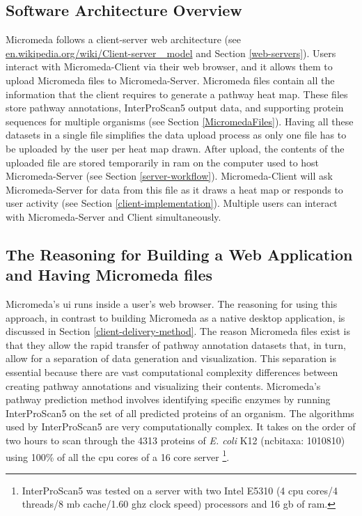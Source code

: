 \subsection{Software Architecture Overview}

Micromeda follows a client-server web architecture \cite{svobodova1985client} (see \href{http://en.wikipedia.org/wiki/Client-server_model}{en.wikipedia.org/wiki/Client-server \_model} and Section \ref{web-servers}). Users interact with Micromeda-Client via their web browser, and it allows them to upload Micromeda files to Micromeda-Server. Micromeda files contain all the information that the client requires to generate a pathway heat map. These files store pathway annotations, InterProScan5 output data, and supporting protein sequences for multiple organisms (see Section \ref{MicromedaFiles}). Having all these datasets in a single file simplifies the data upload process as only one file has to be uploaded by the user per heat map drawn. After upload, the contents of the uploaded file are stored temporarily in \gls{ram} on the computer used to host Micromeda-Server (see Section \ref{server-workflow}). Micromeda-Client will ask Micromeda-Server for data from this file as it draws a heat map or responds to user activity (see Section \ref{client-implementation}). Multiple users can interact with Micromeda-Server and Client simultaneously.

\subsection{The Reasoning for Building a Web Application and Having Micromeda files} \label{why-micromeda-files}

Micromeda's \gls{ui} runs inside a user's web browser. The reasoning for using this approach, in contrast to building Micromeda as a native desktop application, is discussed in Section \ref{client-delivery-method}. The reason Micromeda files exist is that they allow the rapid transfer of pathway annotation datasets that, in turn, allow for a separation of data generation and visualization. This separation is essential because there are vast computational complexity differences between creating pathway annotations and visualizing their contents. Micromeda's pathway prediction method involves identifying specific enzymes by running InterProScan5 on the set of all predicted proteins of an organism. The algorithms used by InterProScan5 are very computationally complex. It takes on the order of two hours to scan through the 4313 proteins of \textit{E. coli} K12 (\gls{ncbitaxa}: 1010810) using 100\% of all the \gls{cpu} cores of a 16 core server \footnote{InterProScan5 was tested on a server with two Intel E5310 (4 \gls{cpu} cores/4 threads/8 \gls{mb} cache/1.60 \gls{ghz} clock speed) processors and 16 \gls{gb}  of \gls{ram}.}.


